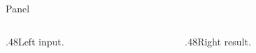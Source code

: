 \documentclass{beamer}
\begin{document}
\begin{frame}
\begin{block}{Panel}
\begin{columns}[onlytextwidth,T]
\begin{column}{.48\textwidth}Left input.\end{column}
\begin{column}{.48\textwidth}Right result.\end{column}
\end{columns}
\end{block}
\end{frame}
\end{document}
